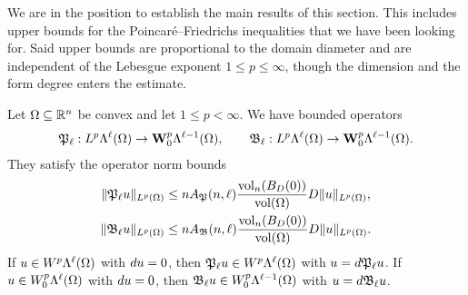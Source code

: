 \documentclass[10pt,letterpaper]{article}
\begin{document}
We are in the position to establish the main results of this section.
This includes upper bounds for the Poincar\'e--Friedrichs inequalities that we have been looking for. 
Said upper bounds are proportional to the domain diameter and are independent of the Lebesgue exponent $1 \leq p \leq \infty$,
though the dimension and the form degree enters the estimate. 

\begin{theorem}
    Let $\Omega \subseteq {\mathbb R}^{n}$ be convex and let $1 \leq p < \infty$. 
    We have bounded operators 
    \begin{align*}
        {\mathfrak P}_{\ell} : L^{p}\Lambda^{\ell}(\Omega) \rightarrow {\mathbf W}^{p}_{0}\Lambda^{\ell-1}(\Omega)
        ,
        \qquad 
        {\mathfrak B}_{\ell} : L^{p}\Lambda^{\ell}(\Omega) \rightarrow {\mathbf W}^{p}_{0}\Lambda^{\ell-1}(\Omega)
        .
    \end{align*}
    They satisfy the operator norm bounds 
    \begin{align*}
        \| {\mathfrak P}_{\ell} u \|_{L^{p}(\Omega)}
        &\leq 
        n A_{{\mathfrak P}}(n,\ell) \frac{ \operatorname{vol}_{n}(B_D(0)) }{\operatorname{vol}(\Omega)} 
        D
        \| u \|_{L^{p}(\Omega)}
        ,
        \\
        \| {\mathfrak B}_{\ell} u \|_{L^{p}(\Omega)}
        &\leq 
        n A_{{\mathfrak B}}(n,\ell) \frac{ \operatorname{vol}_{n}(B_D(0)) }{\operatorname{vol}(\Omega)} 
        D
        \| u \|_{L^{p}(\Omega)}
        .
    \end{align*}
    If $u \in W^{p}    \Lambda^{\ell}(\Omega)$ with $d u = 0$, then ${\mathfrak P}_{\ell} u \in W^{p}    \Lambda^{\ell  }(\Omega)$ with $u = d {\mathfrak P}_{\ell} u$.
    If $u \in W^{p}_{0}\Lambda^{\ell}(\Omega)$ with $d u = 0$, then ${\mathfrak B}_{\ell} u \in W^{p}_{0}\Lambda^{\ell-1}(\Omega)$ with $u = d {\mathfrak B}_{\ell} u$.
\end{theorem}
\end{document}
